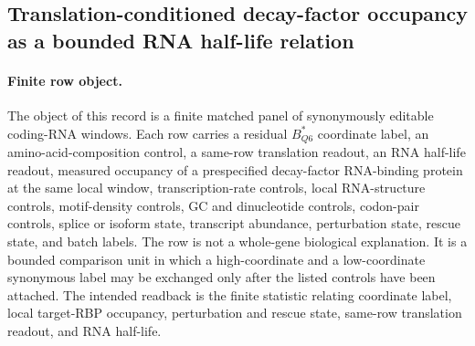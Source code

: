 \subsection{Translation-conditioned decay-factor occupancy as a bounded RNA half-life relation}\label{sec:q6-translation-conditioned-decay-rbp-rna-half-life-cross-layer}

\paragraph{Finite row object.}
The object of this record is a finite matched panel of synonymously editable coding-RNA windows.  Each row carries a residual $B^{*}_{Q6}$ coordinate label, an amino-acid-composition control, a same-row translation readout, an RNA half-life readout, measured occupancy of a prespecified decay-factor RNA-binding protein at the same local window, transcription-rate controls, local RNA-structure controls, motif-density controls, GC and dinucleotide controls, codon-pair controls, splice or isoform state, transcript abundance, perturbation state, rescue state, and batch labels.  The row is not a whole-gene biological explanation.  It is a bounded comparison unit in which a high-coordinate and a low-coordinate synonymous label may be exchanged only after the listed controls have been attached.  The intended readback is the finite statistic relating coordinate label, local target-RBP occupancy, perturbation and rescue state, same-row translation readout, and RNA half-life.

